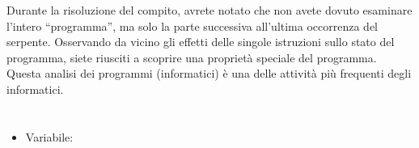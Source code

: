 {{Durante la risoluzione del compito, avrete notato che non avete dovuto esaminare l’intero \enquote{programma}, ma solo la parte successiva all’ultima occorrenza del serpente. Osservando da vicino gli effetti delle singole istruzioni sullo stato del programma, siete riusciti a scoprire una proprietà speciale del programma. Questa analisi dei programmi (informatici) è una delle attività più frequenti degli informatici.



\section*{\BrochureWebsitesAndKeywords}
{\raggedright
\begin{itemize}
  \item Variabile: \href{https://it.wikipedia.org/wiki/Variabile_(informatica)}{}
\end{itemize}


}

}{}

\def\AuthorChanS{} %
\def\AuthorDagieneV{} %
\def\AuthorGaalB{} %
\def\AuthorDatzkoC{} %
\def\AuthorBaumannW{} %
\def\AuthorDatzkoThutS{} %
\def\AuthorPohlW{} %
\def\AuthorGiangC{} %

\newpage}{}
